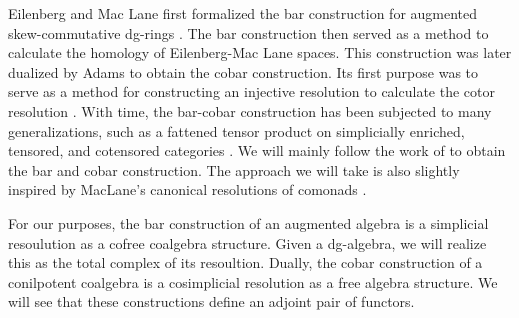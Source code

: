 \documentclass[../thesis.tex]{subfiles}
\begin{document}
            Eilenberg and Mac Lane first formalized the bar construction for augmented skew-commutative dg-rings \cite{Eilenberg53}. The bar construction then served as a method to calculate the homology of Eilenberg-Mac Lane spaces. This construction was later dualized by Adams \cite{Adams56} to obtain the cobar construction. Its first purpose was to serve as a method for constructing an injective resolution to calculate the cotor resolution \cite{Eilenberg65}. With time, the bar-cobar construction has been subjected to many generalizations, such as a fattened tensor product on simplicially enriched, tensored, and cotensored categories \cite{Riehl14}. We will mainly follow the work of \cite{Loday12} to obtain the bar and cobar construction. The approach we will take is also slightly inspired by MacLane's canonical resolutions of comonads \cite{MacLane71}.

            For our purposes, the bar construction of an augmented algebra is a simplicial resoulution as a cofree coalgebra structure. Given a dg-algebra, we will realize this as the total complex of its resoultion. Dually, the cobar construction of a conilpotent coalgebra is a cosimplicial resolution as a free algebra structure. We will see that these constructions define an adjoint pair of functors.



\end{document}
